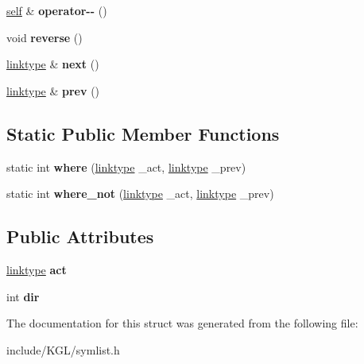 \begin{DoxyCompactItemize}
\mbox{\label{structsymlist__iterator_a510c633d2c7d830afa57acfa36434e52}} 
\mbox{\hyperlink{structsymlist__iterator}{self}} \& {\bfseries operator-\/-\/} ()
\item 
\mbox{\label{structsymlist__iterator_a4135864290fda971467e41869b20e904}} 
void {\bfseries reverse} ()
\item 
\mbox{\label{structsymlist__iterator_ad363a9756ff599c960668320a93532ed}} 
\mbox{\hyperlink{structsymnode}{linktype}} \& {\bfseries next} ()
\item 
\mbox{\label{structsymlist__iterator_a30f1c0a962713ded0c24871093089fb0}} 
\mbox{\hyperlink{structsymnode}{linktype}} \& {\bfseries prev} ()
\end{DoxyCompactItemize}
\subsection*{Static Public Member Functions}
\begin{DoxyCompactItemize}
\item 
\mbox{\label{structsymlist__iterator_a260b63ae284e3f07ae510105c7edd6a0}} 
static int {\bfseries where} (\mbox{\hyperlink{structsymnode}{linktype}} \+\_\+act, \mbox{\hyperlink{structsymnode}{linktype}} \+\_\+prev)
\item 
\mbox{\label{structsymlist__iterator_abeee238d3bfff557cdbf08a05b632fa8}} 
static int {\bfseries where\+\_\+not} (\mbox{\hyperlink{structsymnode}{linktype}} \+\_\+act, \mbox{\hyperlink{structsymnode}{linktype}} \+\_\+prev)
\end{DoxyCompactItemize}
\subsection*{Public Attributes}
\begin{DoxyCompactItemize}
\item 
\mbox{\label{structsymlist__iterator_a1c7a0193ab85baa7705070975d841fc8}} 
\mbox{\hyperlink{structsymnode}{linktype}} {\bfseries act}
\item 
\mbox{\label{structsymlist__iterator_a8433e558ceb6b17b225414ef46b4a3e2}} 
int {\bfseries dir}
\end{DoxyCompactItemize}


The documentation for this struct was generated from the following file\+:\begin{DoxyCompactItemize}
\item 
include/\+K\+G\+L/symlist.\+h\end{DoxyCompactItemize}

